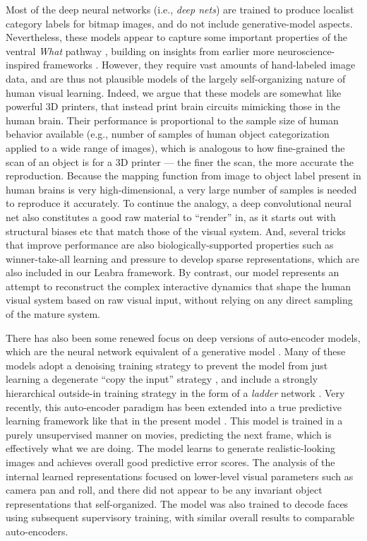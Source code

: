 \documentclass[11pt,twoside]{article}
\newif\myifpdf
\begin{document}
Most of the deep neural networks (i.e., {\em deep nets}) are trained to produce localist category labels for bitmap images, and do not include generative-model aspects.  Nevertheless, these models appear to capture some important properties of the ventral {\em What} pathway \cite[e.g.,]{MajajHongSolomonEtAl15}, building on insights from earlier more neuroscience-inspired frameworks \cite{RiesenhuberPoggio99}.  However, they require vast amounts of hand-labeled image data, and are thus not plausible models of the largely self-organizing nature of human visual learning.  Indeed, we argue that these models are somewhat like powerful 3D printers, that instead print brain circuits mimicking those in the human brain.  Their performance is proportional to the sample size of human behavior available (e.g., number of samples of human object categorization applied to a wide range of images), which is analogous to how fine-grained the scan of an object is for a 3D printer --- the finer the scan, the more accurate the reproduction.  Because the mapping function from image to object label present in human brains is very high-dimensional, a very large number of samples is needed to reproduce it accurately.  To continue the analogy, a deep convolutional neural net also constitutes a good raw material to ``render'' in, as it starts out with structural biases etc that match those of the visual system.  And, several tricks that improve performance are also biologically-supported properties such as winner-take-all learning and pressure to develop sparse representations, which are also included in our Leabra framework.  By contrast, our model represents an attempt to reconstruct the complex interactive dynamics that shape the human visual system based on raw visual input, without relying on any direct sampling of the mature system.

There has also been some renewed focus on deep versions of auto-encoder models, which are the neural network equivalent of a generative model \cite{BengioYaoAlainEtAl13,Valpola14,RasmusBerglundHonkalaEtAl15,LeMongaDevinEtAl12}.  Many of these models adopt a denoising training strategy to prevent the model from just learning a degenerate ``copy the input'' strategy \cite{BengioYaoAlainEtAl13}, and include a strongly hierarchical outside-in training strategy in the form of a {\em ladder} network \cite{Valpola14,RasmusBerglundHonkalaEtAl15}.  Very recently, this auto-encoder paradigm has been extended into a true predictive learning framework like that in the present model \cite{LotterKreimanCox16}.  This model is trained in a purely unsupervised manner on movies, predicting the next frame, which is effectively what we are doing.  The model learns to generate realistic-looking images and achieves overall good predictive error scores.  The analysis of the internal learned representations focused on lower-level visual parameters such as camera pan and roll, and there did not appear to be any invariant object representations that self-organized.  The model was also trained to decode faces using subsequent supervisory training, with similar overall results to comparable auto-encoders.
\end{document}
